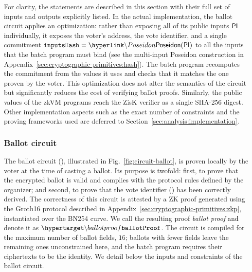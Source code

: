 \begin{remark}
For clarity, the statements are described in this section with their full set of inputs and outputs explicitly listed. In the actual implementation, the ballot circuit applies an optimization: rather than exposing all of its public inputs ${\sf{PI}}$ individually, it exposes the voter's address, the vote identifier, and a single commitment $\ballotinputshash = \hlget{\Poseidon}(\publicinputs)$ to all the inputs that the batch program must bind (see the multi-input Poseidon construction in Appendix~\ref{sec:cryptographic-primitives:hash}). The batch program recomputes the commitment from the values it uses and checks that it matches the one proven by the voter. This optimization does not alter the semantics of the circuit but significantly reduces the cost of verifying ballot proofs. Similarly, the public values of the \ac{zkVM} programs reach the ZisK verifier as a single SHA-256 digest. Other implementation aspects such as the exact number of constraints and the proving frameworks used are deferred to Section~\ref{sec:analysis:implementation}.
\end{remark}

\subsubsection{Ballot circuit}
\label{sec:vocdoni-protocol:circuits:ballot}

The ballot circuit (\hlset{\ballotcircuit}), illustrated in Fig.~\ref{fig:circuit-ballot}, is proven locally by the voter at the time of casting a ballot. Its purpose is twofold: first, to prove that the encrypted ballot is valid and complies with the protocol rules defined by the organizer; and second, to prove that the vote identifier (\voteid) has been correctly derived. The correctness of this circuit is attested by a \ac{ZK} proof generated using the Groth16 protocol described in Appendix~\ref{sec:cryptographic-primitives:zkp}, instantiated over the BN254 curve. We call the resulting proof \textit{ballot proof} and denote it as $\hlset{\ballotproof}$. The circuit is compiled for the maximum number of ballot fields, $16$; ballots with fewer fields leave the remaining ones unconstrained here, and the batch program requires their ciphertexts to be the identity. We detail below the inputs and constraints of the ballot circuit.

